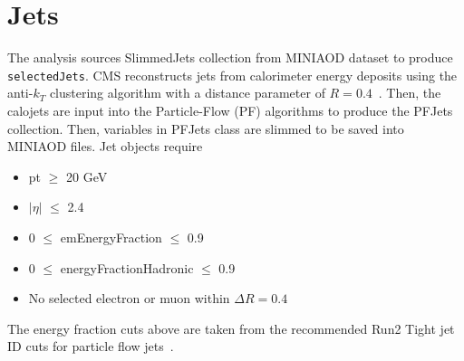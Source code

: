 \section{Jets}\label{sec:jets}
The analysis sources SlimmedJets collection from MINIAOD dataset to produce {\tt selectedJets}.
CMS reconstructs jets from calorimeter energy deposits using the
anti-$k_T$ clustering algorithm with a distance parameter of $R=0.4$~\cite{Cacciari:2008gp}.
Then, the calojets are input into the Particle-Flow (PF) algorithms to produce the PFJets collection. Then, variables in PFJets class are slimmed to be saved into MINIAOD files.
Jet objects require
\begin{itemize}
  \item pt $\geq$ 20 GeV
  \item $|\eta|$ $\leq$ 2.4
  \item 0 $\leq$ emEnergyFraction $\leq$ 0.9
  \item 0 $\leq$ energyFractionHadronic $\leq$ 0.9
  \item No selected electron or muon within $\Delta R=0.4$
\end{itemize}
The energy fraction cuts above are taken from the recommended Run2 Tight jet ID
cuts for particle flow jets~\cite{jetid_2018}.

